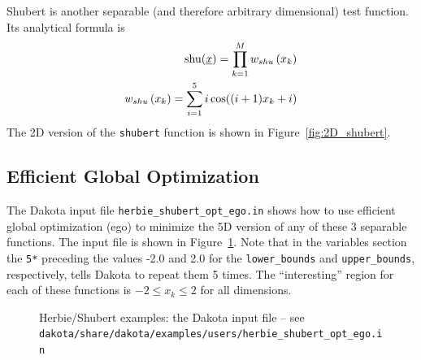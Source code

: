 Shubert is another separable (and therefore arbitrary dimensional)
test function. Its analytical formula is
\begin{eqnarray*}
{\rm shu}(\underline{x})= \prod_{k=1}^M w_{shu}\left(x_k\right) \\
w_{shu}\left(x_k\right)= \sum_{i=1}^5 i\cos((i+1)x_k+i)
\end{eqnarray*}
The 2D version of the \texttt{shubert} function is shown in
Figure~\ref{fig:2D_shubert}.

\subsection{Efficient Global Optimization}

The Dakota input file \texttt{herbie\_shubert\_opt\_ego.in} shows how
to use efficient global optimization (ego) to minimize the 5D version
of any of these 3 separable functions. The input file is shown in
Figure~\ref{additional:herbie_shubert_ego}. Note that in the variables
section the \texttt{5*} preceding the values -2.0 and 2.0 for the
\texttt{lower\_bounds} and \texttt{upper\_bounds}, respectively, tells
Dakota to repeat them 5 times. The ``interesting'' region for each
of these functions is $-2\le x_k \le 2$ for all dimensions.

\begin{figure}[ht!]
  \centering
  \begin{small}
    \begin{bigbox}
    \end{bigbox}
  \end{small}
  \caption{Herbie/Shubert examples: the Dakota input file --
see \texttt{dakota/share/dakota/examples/users/herbie\_shubert\_opt\_ego.in} }
  \label{additional:herbie_shubert_ego}
\end{figure}

